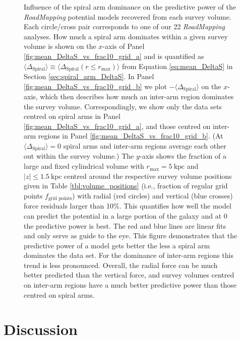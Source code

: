 \documentclass[iop,revtex4,numberedappendix,appendixfloats]{emulateapj}
\newcommand{\RM}{{\sl RoadMapping}}
\begin{document}
\begin{figure}[!htbp]
\caption{Influence of the spiral arm dominance on the predictive power of the \RM{} potential models recovered from each survey volume. Each circle/cross pair corresponds to one of our 22 \RM{} analyses. How much a spiral arm dominates within a given survey volume is shown on the $x$-axis of Panel \ref{fig:mean_DeltaS_vs_frac10_grid_a} and is quantified as $\langle \Delta_\text{Spiral} \rangle \equiv \langle \Delta_\text{Spiral}(r\leq r_\text{max})\rangle$ from Equation \eqref{eq:mean_DeltaS} in Section \ref{sec:spiral_arm_DeltaS}. In Panel \ref{fig:mean_DeltaS_vs_frac10_grid_b} we plot $-\langle \Delta_\text{Spiral}\rangle$ on the $x$-axis, which then describes how much an inter-arm region dominates the survey volume. Correspondingly, we show only the data sets centred on spiral arms in Panel \ref{fig:mean_DeltaS_vs_frac10_grid_a}, and those centred on inter-arm regions in Panel \ref{fig:mean_DeltaS_vs_frac10_grid_b}. (At $\langle \Delta_\text{Spiral} \rangle=0$ spiral arms and inter-arm regions average each other out within the survey volume.) The $y$-axis shows the fraction of a large and fixed cylindrical volume with $r_\text{max}=5~\text{kpc}$ and $|z| \leq 1.5~\text{kpc}$ centred around the respective survey volume positions given in Table \ref{tbl:volume_positions} (i.e., fraction of regular grid points  $f_\text{grid points}$) with radial (red circles) and vertical (blue crosses) force residuals larger than 10\%.  This quantifies how well the model can predict the potential in a large portion of the galaxy and at $0$ the predictive power is best. The red and blue lines are linear fits and only serve as guide to the eye. This figure demonstrates that the predictive power of a model gets better the less a spiral arm dominates the data set. For the dominance of inter-arm regions this trend is less pronounced. Overall, the radial force can be much better predicted than the vertical force, and survey volumes centred on inter-arm regions have a much better predictive power than those centred on spiral arms.}
\label{fig:mean_DeltaS_vs_frac10_grid}
\end{figure}

\section{Discussion} \label{sec:discussion}
\end{document}
